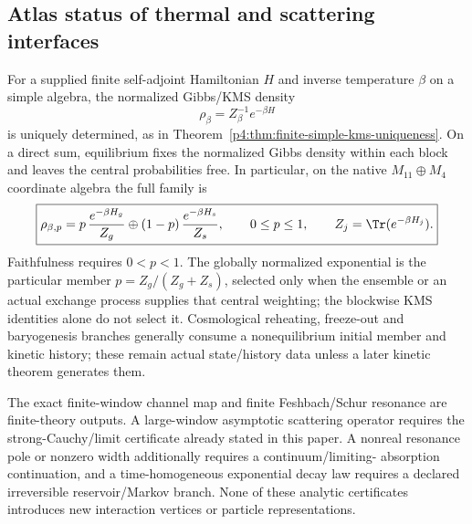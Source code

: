 \documentclass[12pt,a4paper]{article}
\begin{document}
\subsection{Atlas status of thermal and scattering interfaces}
\label{p4:sec:v236-state-scattering-atlas}
\begin{proposition}
\label{p4:prop:v236-thermal-atlas}
For a supplied finite self-adjoint Hamiltonian \(H\) and inverse temperature
\(\beta\) on a simple algebra, the normalized Gibbs/KMS density
\[
 \rho_\beta=Z_\beta^{-1}e^{-\beta H}
\]
is uniquely determined, as in
Theorem~\ref{p4:thm:finite-simple-kms-uniqueness}.  On a direct sum,
equilibrium fixes the normalized Gibbs density within each block and leaves
the central probabilities free.  In particular, on the native
\(M_{11}\oplus M_4\) coordinate algebra the full family is
\[
 \boxed{\rho_{\beta,p}
 =p\,\frac{e^{-\beta H_g}}{Z_g}
  \oplus(1-p)\,\frac{e^{-\beta H_s}}{Z_s},
 \qquad 0\le p\le1,\qquad
 Z_j=\Tr(e^{-\beta H_j}).}
\]
Faithfulness requires \(0<p<1\).  The globally normalized exponential is
the particular member \(p=Z_g/(Z_g+Z_s)\), selected only when the ensemble
or an actual exchange process supplies that central weighting; the
blockwise KMS identities alone do not select it.  Cosmological reheating,
freeze-out and baryogenesis branches generally consume a nonequilibrium
initial member and kinetic history; these remain actual state/history data
unless a later kinetic theorem generates them.
\end{proposition}
\begin{proposition}
\label{p4:prop:v236-scattering-atlas}
The exact finite-window channel map and finite Feshbach/Schur resonance are
finite-theory outputs.  A large-window asymptotic scattering operator requires
the strong-Cauchy/limit certificate already stated in this paper.  A nonreal
resonance pole or nonzero width additionally requires a continuum/limiting-
absorption continuation, and a time-homogeneous exponential decay law requires
a declared irreversible reservoir/Markov branch.  None of these analytic
certificates introduces new interaction vertices or particle representations.
\end{proposition}



\end{document}
